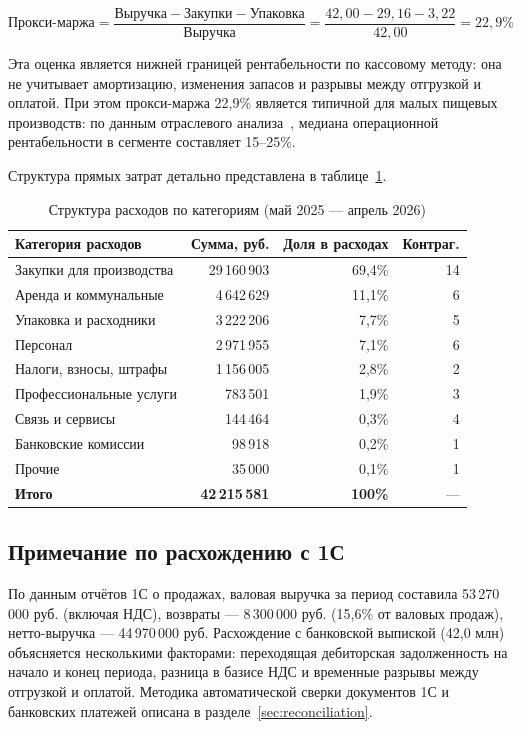 \begin{equation}
\text{Прокси-маржа} = \frac{\text{Выручка} - \text{Закупки} - \text{Упаковка}}{\text{Выручка}} = \frac{42{,}00 - 29{,}16 - 3{,}22}{42{,}00} = 22{,}9\%
\end{equation}

Эта оценка является нижней границей рентабельности по кассовому методу: она не учитывает амортизацию, изменения запасов и разрывы между отгрузкой и оплатой. При этом прокси-маржа 22,9\% является типичной для малых пищевых производств: по данным отраслевого анализа~\cite{sme_profitability_ru}, медиана операционной рентабельности в сегменте составляет 15--25\%.

Структура прямых затрат детально представлена в таблице~\ref{tab:cost_structure}.

\begin{table}[H]
\centering
\caption{Структура расходов по категориям (май 2025 --- апрель 2026)}
\label{tab:cost_structure}
\begin{tabular}{lrrr}
\toprule
\textbf{Категория расходов} & \textbf{Сумма, руб.} & \textbf{Доля в расходах} & \textbf{Контраг.} \\
\midrule
Закупки для производства & 29\,160\,903 & 69,4\% & 14 \\
Аренда и коммунальные & 4\,642\,629 & 11,1\% & 6 \\
Упаковка и расходники & 3\,222\,206 & 7,7\% & 5 \\
Персонал & 2\,971\,955 & 7,1\% & 6 \\
Налоги, взносы, штрафы & 1\,156\,005 & 2,8\% & 2 \\
Профессиональные услуги & 783\,501 & 1,9\% & 3 \\
Связь и сервисы & 144\,464 & 0,3\% & 4 \\
Банковские комиссии & 98\,918 & 0,2\% & 1 \\
Прочие & 35\,000 & 0,1\% & 1 \\
\midrule
\textbf{Итого} & \textbf{42\,215\,581} & \textbf{100\%} & --- \\
\bottomrule
\end{tabular}
\end{table}

\subsection{Примечание по расхождению с 1С}

По данным отчётов 1С о продажах, валовая выручка за период составила 53\,270\,000 руб. (включая НДС), возвраты --- 8\,300\,000 руб. (15,6\% от валовых продаж), нетто-выручка --- 44\,970\,000 руб. Расхождение с банковской выпиской (42,0 млн) объясняется несколькими факторами: переходящая дебиторская задолженность на начало и конец периода, разница в базисе НДС и временные разрывы между отгрузкой и оплатой. Методика автоматической сверки документов 1С и банковских платежей описана в разделе~\ref{sec:reconciliation}.

